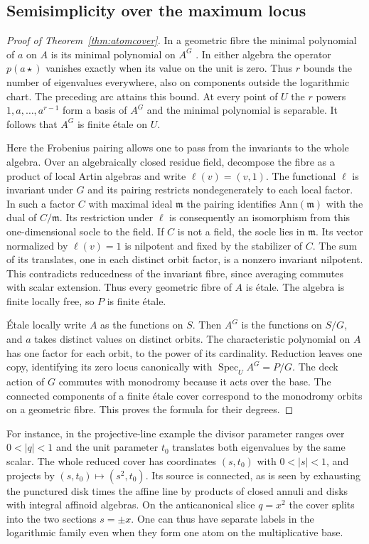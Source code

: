 \subsection{Semisimplicity over the maximum locus}
\begin{proof}[Proof of Theorem~\ref{thm:atomcover}]
In a geometric fibre the minimal polynomial of $a$ on $A$ is its minimal polynomial on $A^G$ \cite[Lemma~5.19]{KKPY}. In either algebra the operator $p(a\star)$ vanishes exactly when its value on the unit is zero. Thus $r$ bounds the number of eigenvalues everywhere, also on components outside the logarithmic chart. The preceding arc attains this bound. At every point of $U$ the $r$ powers $1,a,\ldots,a^{r-1}$ form a basis of $A^G$ and the minimal polynomial is separable. It follows that $A^G$ is finite étale on $U$.

Here the Frobenius pairing allows one to pass from the invariants to the whole algebra. Over an algebraically closed residue field, decompose the fibre as a product of local Artin algebras and write $\ell(v)=(v,1)$. The functional $\ell$ is invariant under $G$ and its pairing restricts nondegenerately to each local factor. In such a factor $C$ with maximal ideal $\mathfrak m$ the pairing identifies $\mathrm{Ann}(\mathfrak m)$ with the dual of $C/\mathfrak m$. Its restriction under $\ell$ is consequently an isomorphism from this one-dimensional socle to the field. If $C$ is not a field, the socle lies in $\mathfrak m$. Its vector normalized by $\ell(v)=1$ is nilpotent and fixed by the stabilizer of $C$. The sum of its translates, one in each distinct orbit factor, is a nonzero invariant nilpotent. This contradicts reducedness of the invariant fibre, since averaging commutes with scalar extension. Thus every geometric fibre of $A$ is étale. The algebra is finite locally free, so $P$ is finite étale.

Étale locally write $A$ as the functions on $S$. Then $A^G$ is the functions on $S/G$, and $a$ takes distinct values on distinct orbits. The characteristic polynomial on $A$ has one factor for each orbit, to the power of its cardinality. Reduction leaves one copy, identifying its zero locus canonically with $\operatorname{Spec}_U A^G=P/G$. The deck action of $G$ commutes with monodromy because it acts over the base. The connected components of a finite étale cover correspond to the monodromy orbits on a geometric fibre. This proves the formula for their degrees.
\end{proof}

For instance, in the projective-line example the divisor parameter ranges over $0<|q|<1$ and the unit parameter $t_0$ translates both eigenvalues by the same scalar. The whole reduced cover has coordinates $(s,t_0)$ with $0<|s|<1$, and projects by $(s,t_0)\mapsto(s^2,t_0)$. Its source is connected, as is seen by exhausting the punctured disk times the affine line by products of closed annuli and disks with integral affinoid algebras. On the anticanonical slice $q=x^2$ the cover splits into the two sections $s=\pm x$. One can thus have separate labels in the logarithmic family even when they form one atom on the multiplicative base.

